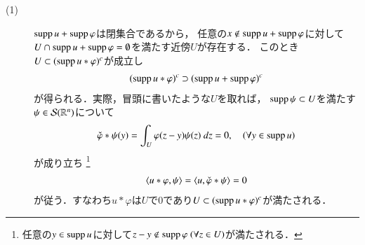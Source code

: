 	\begin{prf}\mbox{}
		\begin{description}
			\item[(1)]
				$\operatorname{supp} u + \operatorname{supp} \varphi$は閉集合であるから，
				任意の$x \notin \operatorname{supp} u+\operatorname{supp} \varphi$に対して
				$U \cap \operatorname{supp} u+\operatorname{supp} \varphi = \emptyset$を満たす近傍$U$が存在する．
				このとき$U \subset (\operatorname{supp} u \ast \varphi)^c$が成立し
				\begin{align}
					(\operatorname{supp} u \ast \varphi)^c
					\supset (\operatorname{supp} u + \operatorname{supp} \varphi)^c
				\end{align}
				が得られる．実際，冒頭に書いたような$U$を取れば，
				$\operatorname{supp} \psi \subset U$を満たす$\psi \in \mathcal{S}(\mathbb{R}^n)$について
				\begin{align}
					\check{\varphi} \ast \psi (y)
					= \int_{U} \varphi(z - y)\psi(z)\ dz
					= 0,
					\quad (\forall y \in \operatorname{supp} u)
				\end{align}
				が成り立ち
				\footnote{
					任意の$y \in \operatorname{supp} u$に対して$z - y \notin \operatorname{supp} \varphi\ (\forall z \in U)$が満たされる．
				}
				\begin{align}
					\inprod<u \ast \varphi, \psi>
					= \inprod<u, \check{\varphi} \ast \psi>
					= 0
				\end{align}
				が従う．すなわち$u \ast \varphi$は$U$で0であり$U \subset (\operatorname{supp} u \ast \varphi)^c$が満たされる．
				\QED
		\end{description}
	\end{prf}